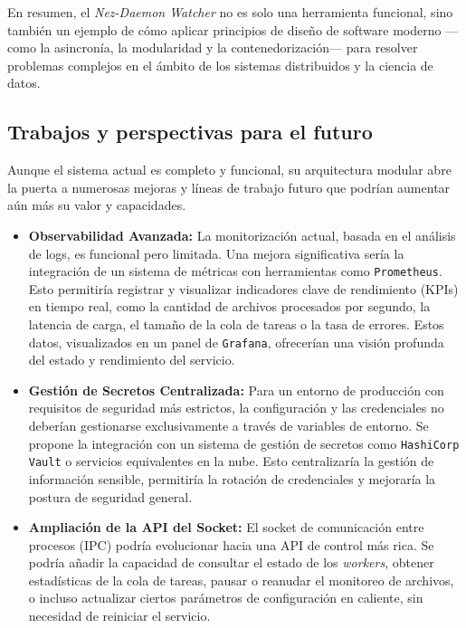 En resumen, el \textit{Nez-Daemon Watcher} no es solo una herramienta funcional, sino también un ejemplo de cómo aplicar principios de diseño de software moderno —como la asincronía, la modularidad y la contenedorización— para resolver problemas complejos en el ámbito de los sistemas distribuidos y la ciencia de datos.

\subsection{Trabajos y perspectivas para el futuro}
Aunque el sistema actual es completo y funcional, su arquitectura modular abre la puerta a numerosas mejoras y líneas de trabajo futuro que podrían aumentar aún más su valor y capacidades.

\begin{itemize}
\item \textbf{Observabilidad Avanzada:} La monitorización actual, basada en el análisis de logs, es funcional pero limitada. Una mejora significativa sería la integración de un sistema de métricas con herramientas como \texttt{Prometheus}. Esto permitiría registrar y visualizar indicadores clave de rendimiento (KPIs) en tiempo real, como la cantidad de archivos procesados por segundo, la latencia de carga, el tamaño de la cola de tareas o la tasa de errores. Estos datos, visualizados en un panel de \texttt{Grafana}, ofrecerían una visión profunda del estado y rendimiento del servicio.

    \item \textbf{Gestión de Secretos Centralizada:} Para un entorno de producción con requisitos de seguridad más estrictos, la configuración y las credenciales no deberían gestionarse exclusivamente a través de variables de entorno. Se propone la integración con un sistema de gestión de secretos como \texttt{HashiCorp Vault} o servicios equivalentes en la nube. Esto centralizaría la gestión de información sensible, permitiría la rotación de credenciales y mejoraría la postura de seguridad general.

    \item \textbf{Ampliación de la API del Socket:} El socket de comunicación entre procesos (IPC) podría evolucionar hacia una API de control más rica. Se podría añadir la capacidad de consultar el estado de los \textit{workers}, obtener estadísticas de la cola de tareas, pausar o reanudar el monitoreo de archivos, o incluso actualizar ciertos parámetros de configuración en caliente, sin necesidad de reiniciar el servicio.


\end{itemize}
